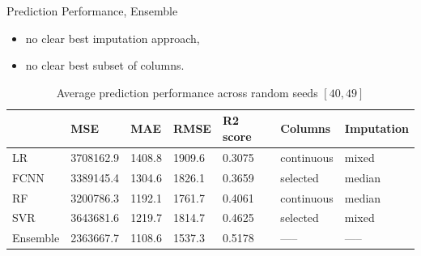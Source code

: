 \documentclass[xcolor=table]{beamer} %
\begin{document}
\begin{frame}{Prediction Performance, Ensemble}
\vspace{-1cm}
\begin{itemize}
    \item no clear best imputation approach,
    \item no clear best subset of columns.
\end{itemize}
\begin{table}[ht!]
\captionsetup{font=scriptsize}
\scriptsize
    \hspace{-0.7cm}
    \begin{tabular}{l|l|l|l|l|l|l}
                 & MSE        & MAE     & RMSE    & R2 score & Columns & Imputation\\
        \hline
        LR       & 3708162.9 & 1408.8 & 1909.6 & 0.3075 & continuous & mixed \\
        FCNN     & 3389145.4 & 1304.6 & 1826.1 & 0.3659 & selected & median \\
        RF       & 3200786.3 & 1192.1 & 1761.7 & 0.4061 & continuous & median \\
        SVR      & 3643681.6 & 1219.7 & 1814.7  & 0.4625 & selected & mixed \\
        \hline
        Ensemble & 2363667.7 & 1108.6 & 1537.3  & 0.5178 & ----- & ----- \\
    \end{tabular}
    \small
    \caption{Average prediction performance across random seeds $[40, 49]$}
    \label{tab:pred_perf}
\end{table}
\end{frame}
\end{document}
